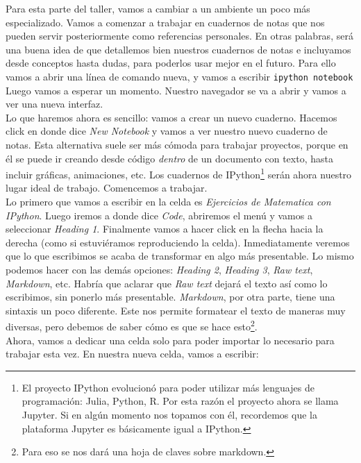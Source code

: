 \documentclass[10pt,letterpaper]{article}
\newcommand{\inlinecode}[1]{
\colorbox{light-gray}{\texttt{#1}}
}
\begin{document}
Para esta parte del taller, vamos a cambiar a un ambiente un poco m\'as especializado. Vamos a comenzar a trabajar en cuadernos de notas que nos pueden servir posteriormente como referencias personales. En otras palabras, ser\'a una buena idea de que detallemos bien nuestros cuadernos de notas e incluyamos desde conceptos hasta dudas, para poderlos usar mejor en el futuro. Para ello vamos a abrir una l\'inea de comando nueva, y vamos a escribir \inlinecode{ipython notebook} Luego vamos a esperar un momento. Nuestro navegador se va a abrir y vamos a ver una nueva interfaz.\\

Lo que haremos ahora es sencillo: vamos a crear un nuevo cuaderno. Hacemos click en donde dice \textit{New Notebook} y vamos a ver nuestro nuevo cuaderno de notas. Esta alternativa suele ser m\'as c\'omoda para trabajar proyectos, porque en \'el se puede ir creando desde c\'odigo \emph{dentro} de un documento con texto, hasta incluir gr\'aficas, animaciones, etc. Los cuadernos de IPython\footnote{El proyecto IPython evolucion\'o para poder utilizar m\'as lenguajes de programaci\'on: Julia, Python, R. Por esta raz\'on el proyecto ahora se llama Jupyter. Si en alg\'un momento nos topamos con \'el, recordemos que la plataforma Jupyter es b\'asicamente igual a IPython.} ser\'an ahora nuestro lugar ideal de trabajo. Comencemos a trabajar.\\

Lo primero que vamos a escribir en la celda es \emph{Ejercicios de Matematica con IPython}. Luego iremos a donde dice \textit{Code}, abriremos el men\'u y vamos a seleccionar \textit{Heading 1}. Finalmente vamos a hacer click en la flecha hacia la derecha (como si estuvi\'eramos reproduciendo la celda). Inmediatamente veremos que lo que escribimos se acaba de transformar en algo m\'as presentable. Lo mismo podemos hacer con las dem\'as opciones: \textit{Heading 2}, \textit{Heading 3}, \textit{Raw text}, \textit{Markdown}, etc. Habr\'ia que aclarar que \textit{Raw text} dejar\'a el texto as\'i como lo escribimos, sin ponerlo m\'as presentable. \textit{Markdown}, por otra parte, tiene una sintaxis un poco diferente. Este nos permite formatear el texto de maneras muy diversas, pero debemos de saber c\'omo es que se hace esto\footnote{Para eso se nos dar\'a una hoja de claves sobre markdown.}.\\

Ahora, vamos a dedicar una celda solo para poder importar lo necesario para trabajar esta vez. En nuestra nueva celda, vamos a escribir:
\end{document}

